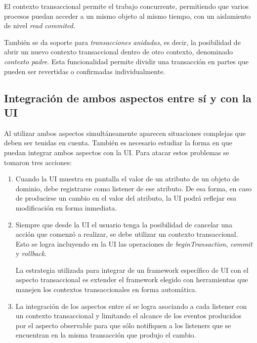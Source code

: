 		El contexto transaccional permite el trabajo concurrente, permitiendo que
		varios procesos puedan acceder a un mismo objeto al mismo
		tiempo, con un aislamiento de nivel \emph{read commited}.
		 
		También se da soporte para \emph{transacciones anidadas}, es decir, la
		posibilidad de abrir un nuevo contexto transaccional dentro de otro contexto,
		denominado \emph{contexto padre}.
		Esta funcionalidad permite dividir una transacción en partes que pueden ser
		revertidas o confirmadas individualmente.
		
	\subsection{Integración de ambos aspectos entre sí y con la UI}
	\label{sec:Union}
		Al utilizar ambos aspectos simultáneamente aparecen situaciones complejas que
		deben ser tenidas en cuenta. También es necesario estudiar la forma en que
		puedan integrar ambos aspectos con la UI.
		Para atacar estos problemas se tomaron tres acciones:
		
		\begin{enumerate}
		  \item Cuando la UI muestra en pantalla el valor de un
		  atributo de un objeto de dominio, debe registrarse como listener de ese
		  atributo.
		  De esa forma, en caso de producirse un cambio en el valor del atributo, la
		  UI podrá reflejar esa modificación en forma inmediata.
		  
		  \item Siempre que desde la UI el usuario tenga la posibilidad de cancelar
		  una acción que comenzó a realizar, se debe utilizar un contexto
		  transaccional.
		  Esto se logra incluyendo en la UI las operaciones de
		  \emph{beginTransaction}, \emph{commit} y \emph{rollback}.
		  
		  La estrategia utilizada para integrar de un framework
		  específico de UI con el aspecto transaccional es extender el framework
		  elegido con herramientas que manejen los contextos transaccionales en forma
		  automática.
		  
		  \item La integración de los aspectos entre sí se logra asociando a
		  cada listener con un contexto transaccional y limitando el alcance de los
		  eventos producidos por el aspecto observable para que sólo notifiquen a los
		  listeners que se encuentran en la misma transacción que produjo el cambio.
		\end{enumerate}
